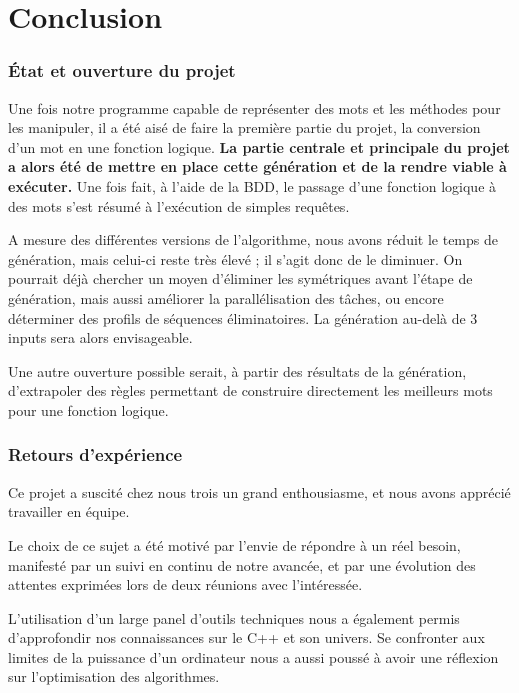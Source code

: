\part*{Conclusion}
\label{conclusion}

\markright{}

\section{État et ouverture du projet}
\label{subsec:conclusion/ouverture}
\par
Une fois notre programme capable de représenter des mots et les méthodes pour les manipuler, il a été aisé de faire la première partie du projet, la conversion d'un mot en une fonction logique. \textbf{La partie centrale et principale du projet a alors été de mettre en place cette génération et de la rendre viable à exécuter.} Une fois fait, à l'aide de la BDD, le passage d'une fonction logique à des mots s'est résumé à l'exécution de simples requêtes.
\par
A mesure des différentes versions de l'algorithme, nous avons réduit le temps de génération, mais celui-ci reste très élevé ; il s'agit donc de le diminuer. On pourrait déjà chercher un moyen d'éliminer les symétriques avant l'étape de génération, mais aussi améliorer la parallélisation des tâches, ou encore déterminer des profils de séquences éliminatoires. La génération au-delà de 3 inputs sera alors envisageable.
\par
Une autre ouverture possible serait, à partir des résultats de la génération, d'extrapoler des règles permettant de construire directement les meilleurs mots pour une fonction logique.

\section{Retours d'expérience}
\label{subsec:conclusion/retours}
\par
Ce projet a suscité chez nous trois un grand enthousiasme, et nous avons apprécié travailler en équipe.
\par
Le choix de ce sujet a été motivé par l'envie de répondre à un réel besoin, manifesté par un suivi en continu de notre avancée, et par une évolution des attentes exprimées lors de deux réunions avec l'intéressée.
\par
L'utilisation d'un large panel d'outils techniques nous a également permis d'approfondir nos connaissances sur le C++ et son univers. Se confronter aux limites de la puissance d'un ordinateur nous a aussi poussé à avoir une réflexion sur l'optimisation des algorithmes.